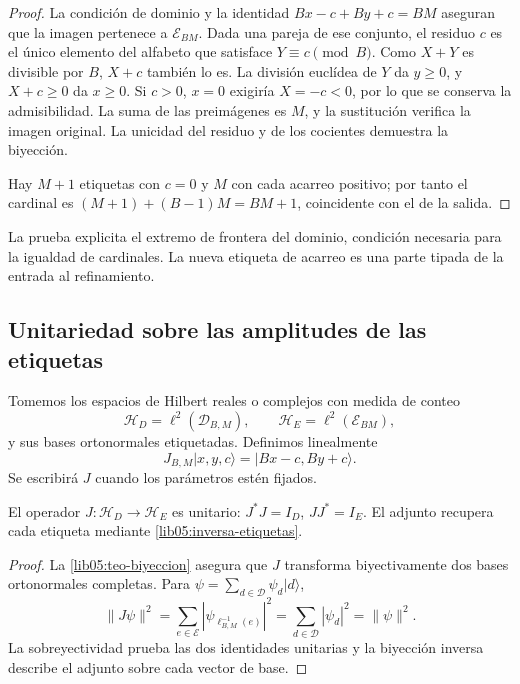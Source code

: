 \begin{proof}
La condición de dominio y la identidad
\(Bx-c+By+c=BM\) aseguran que la imagen pertenece a
\(\mathcal E_{BM}\). Dada una pareja de ese conjunto, el residuo
\(c\) es el único elemento del alfabeto que satisface
\(Y\equiv c\pmod B\). Como \(X+Y\) es divisible por \(B\),
\(X+c\) también lo es. La división euclídea de \(Y\) da
\(y\geq0\), y \(X+c\geq0\) da \(x\geq0\). Si \(c>0\),
\(x=0\) exigiría \(X=-c<0\), por lo que se conserva la
admisibilidad. La suma de las preimágenes es \(M\), y la
sustitución verifica la imagen original. La unicidad del residuo y
de los cocientes demuestra la biyección.

Hay \(M+1\) etiquetas con \(c=0\) y \(M\) con cada acarreo
positivo; por tanto el cardinal es
\((M+1)+(B-1)M=BM+1\), coincidente con el de la salida.
\end{proof}

La prueba explicita el extremo de frontera del dominio, condición
necesaria para la igualdad de cardinales. La nueva etiqueta de acarreo
es una parte tipada de la entrada al refinamiento.

\subsection{Unitariedad sobre las amplitudes de las etiquetas}
\label{lib05:unitariedad}

Tomemos los espacios de Hilbert reales o complejos con medida de conteo
\begin{equation}
 \mathscr H_D=\ell^2(\mathcal D_{B,M}),\qquad
 \mathscr H_E=\ell^2(\mathcal E_{BM}),
 \label{lib05:hilbert}
\end{equation}
y sus bases ortonormales etiquetadas. Definimos linealmente
\begin{equation}
 J_{B,M}|x,y,c\rangle=|Bx-c,By+c\rangle.
 \label{lib05:j}
\end{equation}
Se escribirá \(J\) cuando los parámetros estén fijados.

\begin{proposition}
\label{lib05:prop-unitaria}
El operador \(J:\mathscr H_D\to\mathscr H_E\) es unitario:
\(J^*J=I_D\), \(JJ^*=I_E\). El adjunto recupera cada etiqueta
mediante \eqref{lib05:inversa-etiquetas}.
\end{proposition}

\begin{proof}
La \cref{lib05:teo-biyeccion} asegura que \(J\) transforma
biyectivamente dos bases ortonormales completas. Para
\(\psi=\sum_{d\in\mathcal D}\psi_d|d\rangle\),
\[
 \|J\psi\|^2
 =\sum_{e\in\mathcal E}|\psi_{\ell_{B,M}^{-1}(e)}|^2
 =\sum_{d\in\mathcal D}|\psi_d|^2=\|\psi\|^2.
\]
La sobreyectividad prueba las dos identidades unitarias y la
biyección inversa describe el adjunto sobre cada vector de base.
\end{proof}

